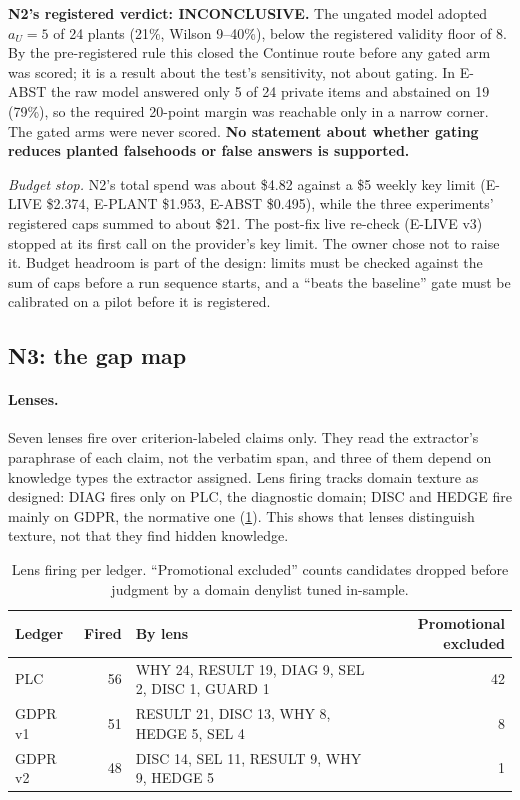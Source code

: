 \begin{evobsbox}[unbreakable]
  \textbf{N2's registered verdict: INCONCLUSIVE.} The ungated model adopted $a_U = 5$ of 24 plants
  (21\%, Wilson 9--40\%), below the registered validity floor of 8. By the pre-registered rule this
  closed the Continue route before any gated arm was scored; it is a result about the test's
  sensitivity, not about gating. In E-ABST the raw model answered only 5 of 24 private items and
  abstained on 19 (79\%), so the required 20-point margin was reachable only in a narrow corner. The
  gated arms were never scored. \textbf{No statement about whether gating reduces planted falsehoods or
  false answers is supported.}
\end{evobsbox}

\evobs{} \emph{Budget stop.} N2's total spend was about \$4.82 against a \$5 weekly key limit (E-LIVE
\$2.374, E-PLANT \$1.953, E-ABST \$0.495), while the three experiments' registered caps summed to about
\$21. The post-fix live re-check (E-LIVE v3) stopped at its first call on the provider's key limit.
The owner chose not to raise it. \evint{} Budget headroom is part of the design: limits must be checked
against the sum of caps before a run sequence starts, and a \enquote{beats the baseline} gate must be
calibrated on a pilot before it is registered.

\subsection{N3: the gap map}\label{sec:results-n3}

\paragraph{Lenses.} \evobs{} Seven lenses fire over criterion-labeled claims only. They read the
extractor's paraphrase of each claim, not the verbatim span, and three of them depend on knowledge types
the extractor assigned. Lens firing tracks domain texture as designed: DIAG fires only on PLC, the
diagnostic domain; DISC and HEDGE fire mainly on GDPR, the normative one (\cref{tab:firing}). This shows
that lenses distinguish texture, not that they find hidden knowledge.

\begin{table}[htbp]
  \centering\small
  \caption{Lens firing per ledger. \enquote{Promotional excluded} counts candidates dropped before
    judgment by a domain denylist tuned in-sample.}
  \label{tab:firing}
  \begin{tabularx}{\linewidth}{@{}lrXr@{}}
    \toprule
    Ledger & Fired & By lens & Promotional excluded \\
    \midrule
    PLC & 56 & WHY 24, RESULT 19, DIAG 9, SEL 2, DISC 1, GUARD 1 & 42 \\
    GDPR v1 & 51 & RESULT 21, DISC 13, WHY 8, HEDGE 5, SEL 4 & 8 \\
    GDPR v2 & 48 & DISC 14, SEL 11, RESULT 9, WHY 9, HEDGE 5 & 1 \\
    \bottomrule
  \end{tabularx}
\end{table}

